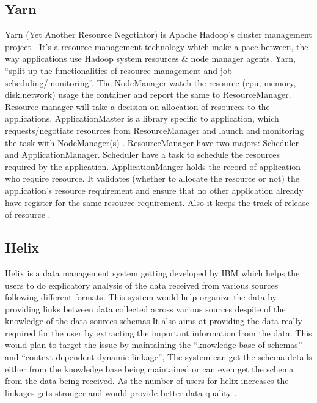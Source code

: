 {     \pv


\subsection{Yarn}

     Yarn (Yet Another Resource Negotiator) is Apache Hadoop’s cluster
     management project \cite{www-cloudera} . It’s a resource
     management technology which make a pace between, the way
     applications use Hadoop system resources \& node manager
     agents. Yarn, ``split up the functionalities of resource
     management and job scheduling/monitoring''. The NodeManager watch
     the resource (cpu, memory, disk,network) usage the container and
     report the same to ResourceManager. Resource manager will take a
     decision on allocation of resources to the
     applications. ApplicationMaster is a library specific to
     application, which requests/negotiate resources from
     ResourceManager and launch and monitoring the task with
     NodeManager(s) \cite{www-architecture}.  ResourceManager have
     two majors: Scheduler and ApplicationManager. Scheduler have a
     task to schedule the resources required by the
     application. ApplicationManger holds the record of application
     who require resource. It validates (whether to allocate the
     resource or not) the application’s resource requirement and
     ensure that no other application already have register for the
     same resource requirement. Also it keeps the track of release of
     resource \cite{www-HadoopApache}.

     \pv

\subsection{Helix}

     Helix is a data management system getting developed by IBM which
     helps the users to do explicatory analysis of the data received
     from various sources following different formats. This system
     would help organize the data by providing links between data
     collected across various sources despite of the knowledge of the
     data sources schemas.It also aims at providing  the data really
     required for the user by extracting the important information
     from the data. This would plan to target the issue by
     maintaining the ``knowledge base of schemas'' and
     ``context-dependent dynamic linkage'', The system can get the
     schema details either from the  knowledge base being maintained
     or can even get the schema from the data being received. As the
     number of users for helix increases the linkages gets stronger
     and would provide better data
     quality \cite{www-ibm-helix-paper}.

}
